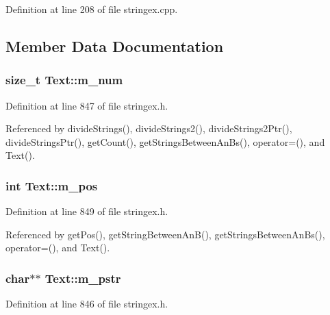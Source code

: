 Definition at line 208 of file stringex.cpp.

\subsection{Member Data Documentation}
\hypertarget{classText_f2c32afcd5df78e128ee510518cdfa80}{
\subsubsection[{m\_\-num}]{\setlength{\rightskip}{0pt plus 5cm}size\_\-t {\bf Text::m\_\-num}}}
\label{classText_f2c32afcd5df78e128ee510518cdfa80}




Definition at line 847 of file stringex.h.

Referenced by divideStrings(), divideStrings2(), divideStrings2Ptr(), divideStringsPtr(), getCount(), getStringsBetweenAnBs(), operator=(), and Text().\hypertarget{classText_75ef67b2a17b16921a57935bd14d5a98}{
\subsubsection[{m\_\-pos}]{\setlength{\rightskip}{0pt plus 5cm}int {\bf Text::m\_\-pos}}}
\label{classText_75ef67b2a17b16921a57935bd14d5a98}




Definition at line 849 of file stringex.h.

Referenced by getPos(), getStringBetweenAnB(), getStringsBetweenAnBs(), operator=(), and Text().\hypertarget{classText_a5170832eb29a4c7d5302e99d7e870b2}{
\subsubsection[{m\_\-pstr}]{\setlength{\rightskip}{0pt plus 5cm}char$\ast$$\ast$ {\bf Text::m\_\-pstr}}}
\label{classText_a5170832eb29a4c7d5302e99d7e870b2}




Definition at line 846 of file stringex.h.

